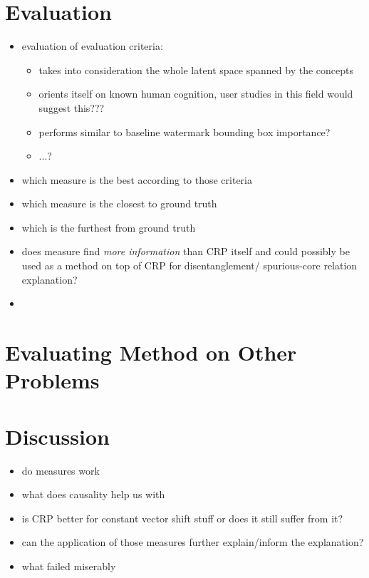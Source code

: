 \section{Evaluation}
\begin{itemize}
    \item evaluation of evaluation criteria:
    \begin{itemize}
        \item takes into consideration the whole latent space spanned by the concepts
        \item orients itself on known human cognition, user studies in this field would suggest this??? 
        \item performs similar to baseline watermark bounding box importance? 
        \item ...? 
    \end{itemize}
    \item which measure is the best according to those criteria
    \item which measure is the closest to ground truth
    \item which is the furthest from ground truth
    \item does measure find \textit{more information} than CRP itself and could possibly be used as a method on top of CRP for disentanglement/ spurious-core relation explanation?
    \item 
\end{itemize}


\section{Evaluating Method on Other Problems}\label{section:further_problems}

\section{Discussion}
\begin{itemize}
    \item do measures work
    \item what does causality help us with
    \item is CRP better for constant vector shift stuff or does it still suffer from it?
    \item can the application of those measures further explain/inform the explanation?
    \item what failed miserably
\end{itemize}
